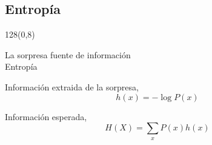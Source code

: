 \documentclass[shownotes]{beamer}
\begin{document}
\subsection{Entrop\'ia}
\begin{frame}
\begin{textblock}{128}(0,8)
\begin{center}
 \large La sorpresa fuente de informaci\'on \\
 Entrop\'ia
\end{center}
\end{textblock} 
  \vspace{1.5cm}
  
  
  \pause
  
Informaci\'on extraida de la sorpresa, 
\begin{equation*}
 h(x) = -\log P(x)
\end{equation*}

\pause \vspace{0.75cm}

Informaci\'on esperada, 
\begin{equation*}
 H(X) = \sum_x P(x) h(x)
\end{equation*}

\pause

\vspace{0.3cm}

\end{frame}
\end{document}
